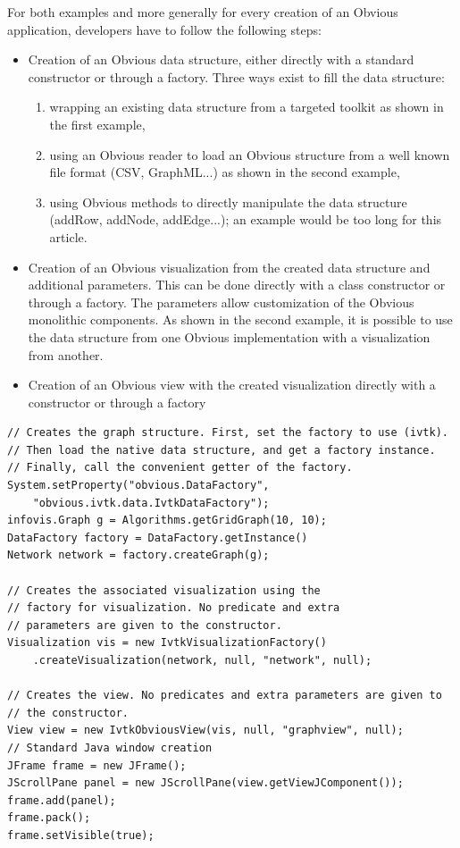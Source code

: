 For both examples and more generally for every creation of an Obvious
application, developers have to follow the following steps:
\begin{itemize}
\item Creation of an Obvious data structure, either directly with a
  standard constructor or through a factory.  Three ways exist to fill
  the data structure:
  \begin{enumerate}
  \item wrapping an existing data structure from a targeted toolkit as
    shown in the first example,
  \item using an Obvious reader to load an Obvious structure from a
    well known file format (CSV, GraphML...) as shown in the second
    example,
  \item using Obvious methods to directly manipulate the data
    structure (addRow, addNode, addEdge...); an example would be too
    long for this article.
 \end{enumerate}

\item Creation of an Obvious visualization from the created data
  structure and additional parameters.  This can be done directly with
  a class constructor or through a factory.  The parameters allow
  customization of the Obvious monolithic components.  As shown in the
  second example, it is possible to use the data structure from
  one Obvious implementation with a visualization from another.

 \item Creation of an Obvious view with the created visualization
   directly with a constructor or through a factory
\end{itemize} 

\begin{lstlisting}[caption={Visualizing a graph with Obvious},label=codeSample1]
// Creates the graph structure. First, set the factory to use (ivtk).
// Then load the native data structure, and get a factory instance.
// Finally, call the convenient getter of the factory.
System.setProperty("obvious.DataFactory",
    "obvious.ivtk.data.IvtkDataFactory");
infovis.Graph g = Algorithms.getGridGraph(10, 10);
DataFactory factory = DataFactory.getInstance()
Network network = factory.createGraph(g);

// Creates the associated visualization using the
// factory for visualization. No predicate and extra
// parameters are given to the constructor.
Visualization vis = new IvtkVisualizationFactory()
    .createVisualization(network, null, "network", null);

// Creates the view. No predicates and extra parameters are given to
// the constructor.
View view = new IvtkObviousView(vis, null, "graphview", null);
// Standard Java window creation
JFrame frame = new JFrame();
JScrollPane panel = new JScrollPane(view.getViewJComponent());
frame.add(panel);
frame.pack();
frame.setVisible(true);
\end{lstlisting}

